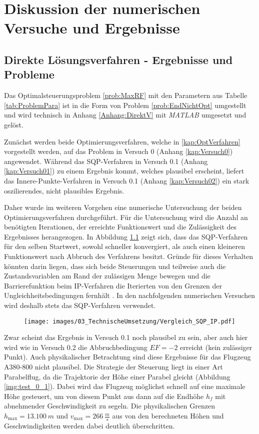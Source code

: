 \chapter{Diskussion der numerischen Versuche und Ergebnisse}\label{kap:LSG}

\section{Direkte Lösungsverfahren - Ergebnisse und Probleme}
Das Optimalsteuerungsproblem \ref{prob:MaxRF} mit den Parametern aus Tabelle \ref{tab:ProblemPara} ist in die Form von Problem \ref{prob:EndNichtOpt} umgestellt und wird technisch in Anhang \ref{Anhang:DirektV} mit \textit{MATLAB} umgesetzt und gelöst.

Zunächst werden beide Optimierungsverfahren, welche in \ref{kap:OptVerfahren} vorgestellt werden, auf das Problem in Versuch 0 (Anhang \ref{kap:Versuch0}) angewendet. Während das SQP-Verfahren in Versuch 0.1 (Anhang \ref{kap:Versuch01}) zu einem Ergebnis kommt, welches plausibel erscheint, liefert das Innere-Punkte-Verfahren in Versuch 0.1 (Anhang \ref{kap:Versuch02}) ein stark oszilierendes, nicht plausibles Ergebnis.

Daher wurde im weiteren Vorgehen eine numerische Untersuchung der beiden Optimierungsverfahren durchgeführt. Für die Untersuchung wird die Anzahl an benötigten Iterationen, der erreichte Funktionswert und die Zulässigkeit des Ergebnisses herangezogen. In Abbildung \ref{img:Vergleich_SQP_IP} zeigt sich, dass das SQP-Verfahren für den selben Startwert, sowohl schneller konvergiert, als auch einen kleineren Funktionswert nach Abbruch des Verfahrens besitzt. Gründe für dieses Verhalten könnten darin liegen, dass sich beide Steuerungen und teilweise auch die Zustandsvariablen am Rand der zulässigen Menge bewegen und die Barrierefunktion beim IP-Verfahren die Iterierten von den Grenzen der Ungleichheitsbedingungen fernhält \cite{Matlab2016}. In den nachfolgenden numerischen Versuchen wird deshalb stets das SQP-Verfahren verwendet.

\begin{figure}[htbp]
    \begin{center}
        \texttt{[image: images/03\_TechnischeUmsetzung/Vergleich\_SQP\_IP.pdf]}
         \label{img:Vergleich_SQP_IP}
    \end{center}
\end{figure}

Zwar scheint das Ergebnis in Versuch 0.1 noch plausibel zu sein, aber auch hier wird wie in Versuch 0.2 die Abbruchbedingung $EF = -2$ erreicht (kein zulässiger Punkt). Auch physikalischer Betrachtung sind diese Ergebnisse für das Flugzeug A380-800 nicht plausibel. Die Strategie der Steuerung liegt in einer Art Parabelflug, da die Trajektorie der Höhe einer Parabel gleicht (Abbildung \ref{img:test_0_1}). Dabei wird das Flugzeug möglichst schnell auf eine maximale Höhe gesteuert, um von diesem Punkt aus dann auf die Endhöhe $h_f$ mit abnehmender Geschwindigkeit zu segeln. Die physikalischen Grenzen $h_{\max} = 13.100 \ m$ und $v_{\max} = 266 \ \frac{m}{s}$ aus \cite{A380Tech} von den berechneten Höhen und Geschwindigkeiten werden dabei deutlich überschritten.

